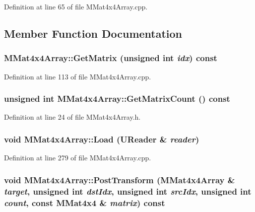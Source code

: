 Definition at line 65 of file MMat4x4Array.cpp.

\subsection{Member Function Documentation}
\hypertarget{class_m_mat4x4_array_d947fe77ec3453921fabc090029279d8}{
\subsubsection[{GetMatrix}]{ MMat4x4Array::GetMatrix (unsigned int {\em idx}) const}}
\label{class_m_mat4x4_array_d947fe77ec3453921fabc090029279d8}




Definition at line 113 of file MMat4x4Array.cpp.\hypertarget{class_m_mat4x4_array_724cf4773d7aa618baaeb1853e14211e}{
\subsubsection[{GetMatrixCount}]{\setlength{\rightskip}{0pt plus 5cm}unsigned int MMat4x4Array::GetMatrixCount () const}}
\label{class_m_mat4x4_array_724cf4773d7aa618baaeb1853e14211e}




Definition at line 24 of file MMat4x4Array.h.\hypertarget{class_m_mat4x4_array_4eb1ad1a6c4090608003253c88aa9892}{
\subsubsection[{Load}]{\setlength{\rightskip}{0pt plus 5cm}void MMat4x4Array::Load ({\bf UReader} \& {\em reader})}}
\label{class_m_mat4x4_array_4eb1ad1a6c4090608003253c88aa9892}




Definition at line 279 of file MMat4x4Array.cpp.\hypertarget{class_m_mat4x4_array_10fca6efd8b664e9622d263f880f5d17}{
\subsubsection[{PostTransform}]{\setlength{\rightskip}{0pt plus 5cm}void MMat4x4Array::PostTransform ({\bf MMat4x4Array} \& {\em target}, \/  unsigned int {\em dstIdx}, \/  unsigned int {\em srcIdx}, \/  unsigned int {\em count}, \/  const {\bf MMat4x4} \& {\em matrix}) const}}
\label{class_m_mat4x4_array_10fca6efd8b664e9622d263f880f5d17}




